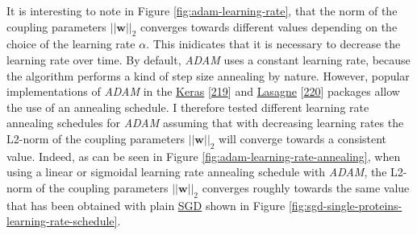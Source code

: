 \documentclass[11pt,a4paper,twoside]{book}
\newcommand{\w}{\mathbf{w}}
\theoremstyle{definition}
\theoremstyle{definition}
\theoremstyle{remark}
\begin{document}
It is interesting to note in Figure \ref{fig:adam-learning-rate}, that
the norm of the coupling parameters \(||\w||_2\) converges towards
different values depending on the choice of the learning rate
\(\alpha\). This inidicates that it is necessary to decrease the
learning rate over time. By default, \emph{ADAM} uses a constant
learning rate, because the algorithm performs a kind of step size
annealing by nature. However, popular implementations of \emph{ADAM} in
the
\href{https://github.com/fchollet/keras/blob/master/keras/optimizers.py\#L385}{Keras}
{[}\protect\hyperlink{ref-Chollet2015}{219}{]} and
\href{https://github.com/Lasagne/Lasagne/blob/master/lasagne/updates.py\#L565-L629}{Lasagne}
{[}\protect\hyperlink{ref-Dieleman2015}{220}{]} packages allow the use
of an annealing schedule. I therefore tested different learning rate
annealing schedules for \emph{ADAM} assuming that with decreasing
learning rates the L2-norm of the coupling parameters \(||\w||_2\) will
converge towards a consistent value. Indeed, as can be seen in Figure
\ref{fig:adam-learning-rate-annealing}, when using a linear or sigmoidal
learning rate annealing schedule with \emph{ADAM}, the L2-norm of the
coupling parameters \(||\w||_2\) converges roughly towards the same
value that has been obtained with plain \protect\hyperlink{abbrev}{SGD}
shown in Figure \ref{fig:sgd-single-proteins-learning-rate-schedule}.
\end{document}
